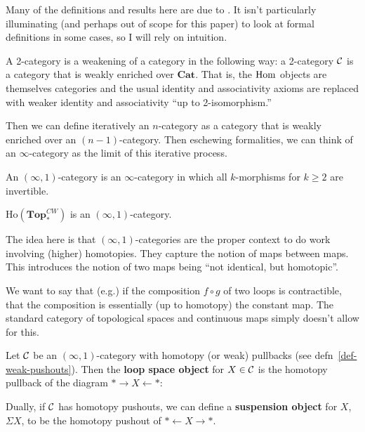 \documentclass[12pt]{article}
\newcommand*{\pCW}{\mathbf{Top}^{CW}_\ast}
\begin{document}
Many of the definitions and results here are due to \cite{lurie}. It isn't particularly illuminating (and perhaps out of scope for this paper)
to look at formal definitions in some cases, so I will rely on intuition.

\begin{rmk}
	A 2-category is a weakening of a category in the following way: a 2-category $\mathcal{C}$ is a category that is weakly enriched over $\mathbf{Cat}$.
	That is, the $\operatorname{Hom}$ objects are themselves categories and the usual identity and associativity axioms are replaced 
	with weaker identity and associativity ``up to 2-isomorphism.''

	Then we can define iteratively an $n$-category as a category that is weakly enriched over an $(n-1)$-category. Then eschewing formalities,
	we can think of an $\infty$-category as the limit of this iterative process.
\end{rmk}

\begin{defn}
	An $(\infty,1)$-category is an $\infty$-category in which all $k$-morphisms for $k\ge 2$ are invertible.
\end{defn}
\begin{prop}
	$\text{Ho}(\pCW)$ is an $(\infty,1)$-category.
\end{prop}
\begin{rmk}
	The idea here is that $(\infty,1)$-categories are the proper context to do work involving (higher) homotopies. They 
	capture the notion of maps between maps. This introduces the notion of two maps being ``not identical, but homotopic''. 
	
	We want to say that (e.g.) if the composition $f\circ g$ of two loops is 
	contractible, that the composition is essentially (up to homotopy) the constant map. The standard category of topological spaces 
	and continuous maps simply doesn't allow for this. 
\end{rmk}

\begin{defn}
	Let $\mathcal{C}$ be an $(\infty,1)$-category with homotopy (or weak) pullbacks (see defn~\ref{def-weak-pushouts}). Then the \textbf{loop space object}
	for $X\in\mathcal{C}$ is the homotopy pullback of the diagram $\ast\to X\leftarrow\ast$:
	\begin{center}
	\end{center}

	Dually, if $\mathcal{C}$ has homotopy pushouts, we can define a \textbf{suspension object} for $X$, $\Sigma X$, to be the homotopy pushout of 
	$\ast\leftarrow X\to \ast.$
\end{defn}
\end{document}
